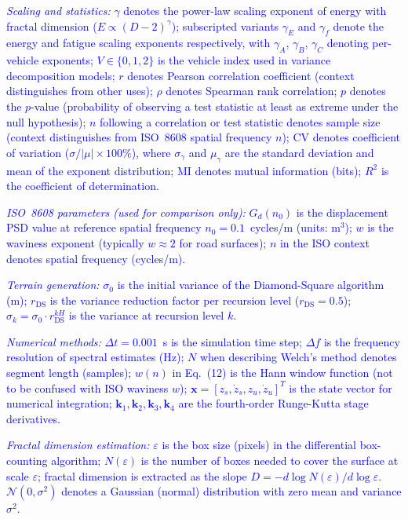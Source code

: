 \documentclass[11pt]{article}
\begin{document}
\textcolor{blue}{\textit{Scaling and statistics:} $\gamma$ denotes the power-law scaling exponent of energy with fractal dimension ($E \propto (D-2)^\gamma$); subscripted variants $\gamma_E$ and $\gamma_f$ denote the energy and fatigue scaling exponents respectively, with $\gamma_A$, $\gamma_B$, $\gamma_C$ denoting per-vehicle exponents; $V \in \{0,1,2\}$ is the vehicle index used in variance decomposition models; $r$ denotes Pearson correlation coefficient (context distinguishes from other uses); $\rho$ denotes Spearman rank correlation; $p$ denotes the $p$-value (probability of observing a test statistic at least as extreme under the null hypothesis); $n$ following a correlation or test statistic denotes sample size (context distinguishes from ISO~8608 spatial frequency $n$); CV denotes coefficient of variation ($\sigma/|\mu| \times 100\%$), where $\sigma_\gamma$ and $\mu_\gamma$ are the standard deviation and mean of the exponent distribution; MI denotes mutual information (bits); $R^2$ is the coefficient of determination.}

\textcolor{blue}{\textit{ISO~8608 parameters (used for comparison only):} $G_d(n_0)$ is the displacement PSD value at reference spatial frequency $n_0 = 0.1$~cycles/m (units: m$^3$); $w$ is the waviness exponent (typically $w \approx 2$ for road surfaces); $n$ in the ISO context denotes spatial frequency (cycles/m).}

\textcolor{blue}{\textit{Terrain generation:} $\sigma_0$ is the initial variance of the Diamond-Square algorithm (m); $r_{\text{DS}}$ is the variance reduction factor per recursion level ($r_{\text{DS}} = 0.5$); $\sigma_k = \sigma_0 \cdot r_{\text{DS}}^{kH}$ is the variance at recursion level $k$.}

\textcolor{blue}{\textit{Numerical methods:} $\Delta t = 0.001$~s is the simulation time step; $\Delta f$ is the frequency resolution of spectral estimates (Hz); $N$ when describing Welch's method denotes segment length (samples); $w(n)$ in Eq.~(12) is the Hann window function (not to be confused with ISO waviness $w$); $\mathbf{x} = [z_s, \dot{z}_s, z_u, \dot{z}_u]^T$ is the state vector for numerical integration; $\mathbf{k}_1, \mathbf{k}_2, \mathbf{k}_3, \mathbf{k}_4$ are the fourth-order Runge-Kutta stage derivatives.}

\textcolor{blue}{\textit{Fractal dimension estimation:} $\varepsilon$ is the box size (pixels) in the differential box-counting algorithm; $N(\varepsilon)$ is the number of boxes needed to cover the surface at scale $\varepsilon$; fractal dimension is extracted as the slope $D = -d\log N(\varepsilon)/d\log \varepsilon$. $\mathcal{N}(0,\sigma^2)$ denotes a Gaussian (normal) distribution with zero mean and variance $\sigma^2$.}
\end{document}
